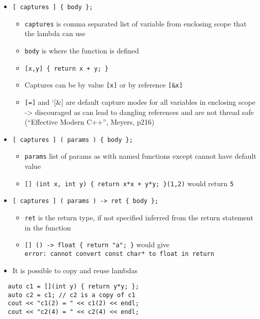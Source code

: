 \begin{itemize}
\tightlist
\item
  \texttt{{[}\ captures\ {]}\ \{\ body\ \};}

  \begin{itemize}
  \tightlist
  \item
    \texttt{captures} is comma separated list of variable from enclosing
    scope that the lambda can use
  \item
    \texttt{body} is where the function is defined
  \item
    \texttt{{[}x,y{]}\ \{\ return\ x\ +\ y;\ \}}
  \item
    Captures can be by value \texttt{{[}x{]}} or by reference
    \texttt{{[}\&x{]}}
  \item
    \texttt{{[}={]}} and `{[}\&{]} are default capture modes for all
    variables in enclosing scope -\textgreater{} discouraged as can lead
    to dangling references and are not thread safe (``Effective Modern
    C++'', Meyers, p216)
  \end{itemize}
\item
  \texttt{{[}\ captures\ {]}\ (\ params\ )\ \{\ body\ \};}

  \begin{itemize}
  \tightlist
  \item
    \texttt{params} list of params as with named functions except cannot
    have default value
  \item
    \texttt{{[}{]}\ (int\ x,\ int\ y)\ \{\ return\ x*x\ +\ y*y;\ \}(1,2)}
    would return \texttt{5}
  \end{itemize}
\item
  \texttt{{[}\ captures\ {]}\ (\ params\ )\ -\textgreater{}\ ret\ \{\ body\ \};}

  \begin{itemize}
  \tightlist
  \item
    \texttt{ret} is the return type, if not specified inferred from the
    return statement in the function
  \item
    \texttt{{[}{]}\ ()\ -\textgreater{}\ float\ \{\ return\ "a";\ \}}
    would give
    \texttt{error:\ cannot\ convert\ const\ char*\ to\ float\ in\ return}
  \end{itemize}
\item
  It is possible to copy and reuse lambdas
\end{itemize}

\begin{verbatim}
  auto c1 = [](int y) { return y*y; };
  auto c2 = c1; // c2 is a copy of c1
  cout << "c1(2) = " << c1(2) << endl;
  cout << "c2(4) = " << c2(4) << endl;
\end{verbatim}


